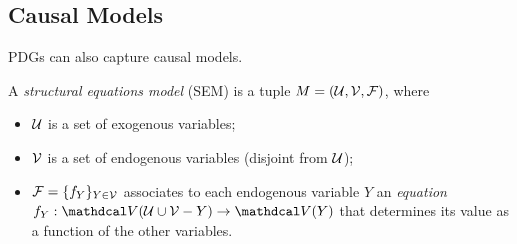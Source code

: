 \subsection{Causal Models}
    \label{ssec:capture-causal-models}


PDGs can also capture causal models. 


\begin{defn}
        \label{defn:SEM}
    A \emph{structural equations model} (SEM) is a tuple
    $M = (\mathcal U, \mathcal V, \mathcal F)$,
    where
    \begin{itemize}[left=0pt,itemsep=0pt,topsep=0pt,parsep=0.3ex]
    \item $\mathcal U$ is a set of exogenous variables;
    \item $\mathcal V$ is a set of endogenous variables (disjoint from $\mathcal U$);
    \item $\mathcal F = \{ f_Y \}_{Y \in \mathcal V}$ associates to each endogenous variable $Y$ an \emph{equation}
    $f_Y : \V (\U \cup \enV - Y) \to \V(Y)$
     that determines its value as a function of the other variables. 
        \qedhere
    \end{itemize}
\end{defn}

